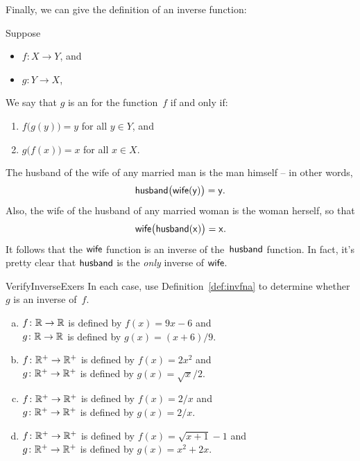 Finally, we can give the definition of an inverse function:

 \begin{defn}\label{def:invfna}
 Suppose 
 \begin{itemize}
 \item $f \colon X \to Y$,
 and
 \item $g \colon Y \to X$,
\end{itemize}
We say that $g$ is an  for the function~$f$ if and only if:
 \begin{enumerate} \renewcommand{\theenumi}{\alph{enumi}}
 \item $f \bigl( g(y) \bigr) = y$ for all $y \in Y$,
 and
 \item $g \bigl( f(x) \bigr) = x$ for all $x \in X$.
 \end{enumerate}
 \end{defn}
 

 \begin{example}{}
The husband of the wife of any married man is the man himself -- in other words,
$$ \sf{husband}\bigl( \sf{wife} (y) \bigr) = y. $$
Also, the wife of the husband of any married woman is the woman herself, so that
$$ \sf{wife}\bigl( \sf{husband} (x) \bigr) = x . $$
It follows that
the $\sf{wife}$ function is an inverse of the~$\sf{husband}$ function. In fact, it's pretty clear that $\sf{husband}$ is the \emph{only} inverse of $\sf{wife}$.
\end{example}
 

 \begin{exercise}{VerifyInverseExers}
 In each case, use Definition~\ref{def:invfna} to determine whether $g$ is an inverse of~$f$.
 \begin{enumerate}[(a)]
 \item \label{VerifyInverseExers-(9x-6)}
$f \colon \mathbb{R} \to \mathbb{R}$ is defined by $f(x) = 9x - 6$ and 
 \\ $g \colon \mathbb{R} \to \mathbb{R}$ is defined by $g(x) = (x + 6)/9$.
 \item \label{VerifyInverseExers-(x^2)}
$f \colon \mathbb{R}^+ \to \mathbb{R}^+$ is defined by $f(x) =2x^2$ and 
 \\ $g \colon \mathbb{R}^+ \to \mathbb{R}^+$ is defined by $g(x) = \sqrt{x}/2$.
 \item \label{VerifyInverseExers-(1/x)}
$f \colon \mathbb{R}^+ \to \mathbb{R}^+$ is defined by $f(x) = 2/x$ and 
 \\ $g \colon \mathbb{R}^+ \to \mathbb{R}^+$ is defined by $g(x) = 2/x$.
 \item \label{VerifyInverseExers-(sqrt(x+1)-1)}
$f \colon \mathbb{R}^+ \to \mathbb{R}^+$ is defined by $f(x) = \sqrt{x+1} - 1$ and 
 \\ $g \colon \mathbb{R}^+ \to \mathbb{R}^+$ is defined by $g(x) = x^2 + 2x$.
 \end{enumerate}
 \end{exercise}
   
